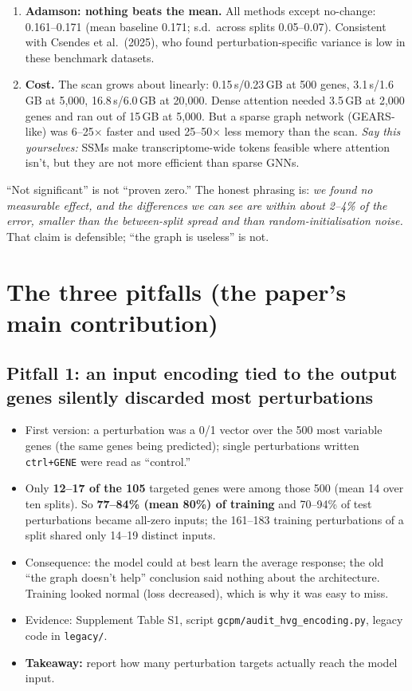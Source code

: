 \documentclass[10.5pt]{article}
\begin{document}
\begin{enumerate}[label=\textbf{F\arabic*.},leftmargin=2em]
and shortened training, so we call it indicative.''
\item \textbf{Adamson: nothing beats the mean.} All methods except no-change: 0.161--0.171 (mean baseline
0.171; s.d.\ across splits 0.05--0.07). Consistent with Csendes et al.\ (2025), who found perturbation-specific
variance is low in these benchmark datasets.
\item \textbf{Cost.} The scan grows about linearly: 0.15\,s/0.23\,GB at 500 genes, 3.1\,s/1.6\,GB at 5,000,
16.8\,s/6.0\,GB at 20,000. Dense attention needed 3.5\,GB at 2,000 genes and ran out of 15\,GB at 5,000. But a
sparse graph network (GEARS-like) was 6--25$\times$ faster and used 25--50$\times$ less memory than the scan.
\emph{Say this yourselves:} SSMs make transcriptome-wide tokens feasible where attention isn't, but they are not
more efficient than sparse GNNs.
\end{enumerate}

\begin{callout}[title={\textbf{How to phrase ``no effect''}}]
``Not significant'' is not ``proven zero.'' The honest phrasing is: \emph{we found no measurable effect, and the
differences we can see are within about 2--4\% of the error, smaller than the between-split spread and than
random-initialisation noise.} That claim is defensible; ``the graph is useless'' is not.
\end{callout}

\section{The three pitfalls (the paper's main contribution)}

\subsection*{Pitfall 1: an input encoding tied to the output genes silently discarded most perturbations}
\begin{itemize}
\item First version: a perturbation was a 0/1 vector over the 500 most variable genes (the same genes being
predicted); single perturbations written \texttt{ctrl+GENE} were read as ``control.''
\item Only \textbf{12--17 of the 105} targeted genes were among those 500 (mean 14 over ten splits). So
\textbf{77--84\% (mean 80\%) of training} and 70--94\% of test perturbations became all-zero inputs; the
161--183 training perturbations of a split shared only 14--19 distinct inputs.
\item Consequence: the model could at best learn the average response; the old ``the graph doesn't help''
conclusion said nothing about the architecture. Training looked normal (loss decreased), which is why it was
easy to miss.
\item Evidence: Supplement Table S1, script \texttt{gcpm/audit\_hvg\_encoding.py}, legacy code in \texttt{legacy/}.
\item \textbf{Takeaway:} report how many perturbation targets actually reach the model input.
\end{itemize}
\end{document}
